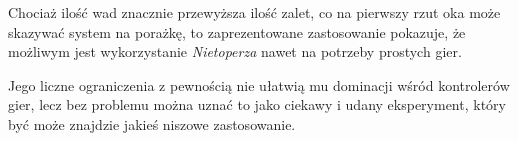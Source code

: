 
Chociaż ilość wad znacznie przewyższa ilość zalet, co na pierwszy rzut oka może skazywać system na porażkę, to zaprezentowane zastosowanie pokazuje, że możliwym jest wykorzystanie \textsl{Nietoperza} nawet na potrzeby prostych gier.

Jego liczne ograniczenia z pewnością nie ułatwią mu dominacji wśród kontrolerów gier, lecz bez problemu można uznać to jako ciekawy i udany eksperyment, który być może znajdzie jakieś niszowe zastosowanie.

